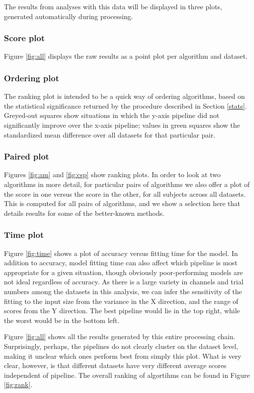 The results from analyses with this data will be displayed in three plots,
generated automatically during processing. 

\subsubsection{Score plot}
Figure \ref{fig:all} displays the raw results as a point plot per algorithm and
dataset.

\subsubsection{Ordering plot}
The ranking plot is intended to be a quick way of ordering algorithms, based on
the statistical significance returned by the procedure described in Section
\ref{stats}. Greyed-out squares show situations in which the y-axis pipeline did
not significantly improve over the x-axis pipeline; values in green squares show
the standardized mean difference over all datasets for that particular
pair. 

\subsubsection{Paired plot}
Figures \ref{fig:am} and \ref{fig:csp} show ranking plots. In order to look at
two algorithms in more detail, for particular pairs of algorithms we also offer
a plot of the score in one versus the score in the other, for all subjects
across all datasets. This is computed for all pairs of algorithms, and we show a
selection here that details results for some of the better-known methods.

\subsubsection{Time plot}
Figure \ref{fig:time} shows a plot of accuracy versus fitting time for the
model. In addition to accuracy, model fitting time can also affect which
pipeline is most appropriate for a given situation, though obviously
poor-performing models are not ideal regardless of accuracy. As there is a large
variety in channels and trial numbers among the datasets in this analysis, we
can infer the sensitivity of the fitting to the input size from the variance in
the X direction, and the range of scores from the Y direction. The best pipeline
would lie in the top right, while the worst would be in the bottom left.

Figure \ref{fig:all} shows all the results generated by this entire processing
chain. Surprisingly, perhaps, the pipelines do not clearly cluster on the
dataset level, making it unclear which ones perform best from simply this
plot. What is very clear, however, is that different datasets have very
different average scores independent of pipeline. The overall ranking of
algortihms can be found in Figure \ref{fig:rank}.

